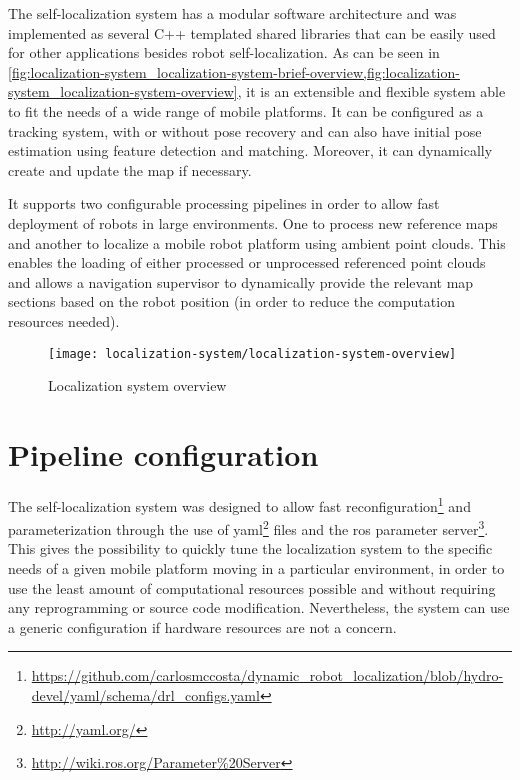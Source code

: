 The self-localization system has a modular software architecture and was implemented as several C++ templated shared libraries that can be easily used for other applications besides robot self-localization. As can be seen in \cref{fig:localization-system_localization-system-brief-overview,fig:localization-system_localization-system-overview}, it is an extensible and flexible system able to fit the needs of a wide range of mobile platforms. It can be configured as a tracking system, with or without pose recovery and can also have initial pose estimation using feature detection and matching. Moreover, it can dynamically create and update the map if necessary.

It supports two configurable processing pipelines in order to allow fast deployment of robots in large environments. One to process new reference maps and another to localize a mobile robot platform using ambient point clouds. This enables the loading of either processed or unprocessed referenced point clouds and allows a navigation supervisor to dynamically provide the relevant map sections based on the robot position (in order to reduce the computation resources needed).

\begin{figure}[H]
	\centering
	\texttt{[image: localization-system/localization-system-overview]}
	\caption{Localization system overview}
	\label{fig:localization-system_localization-system-overview}
\end{figure}



\section{Pipeline configuration}

The self-localization system was designed to allow fast reconfiguration\footnote{\url{https://github.com/carlosmccosta/dynamic_robot_localization/blob/hydro-devel/yaml/schema/drl_configs.yaml}} and parameterization through the use of yaml\footnote{\url{http://yaml.org/}} files and the \gls{ros} parameter server\footnote{\url{http://wiki.ros.org/Parameter\%20Server}}. This gives the possibility to quickly tune the localization system to the specific needs of a given mobile platform moving in a particular environment, in order to use the least amount of computational resources possible and without requiring any reprogramming or source code modification. Nevertheless, the system can use a generic configuration if hardware resources are not a concern.

